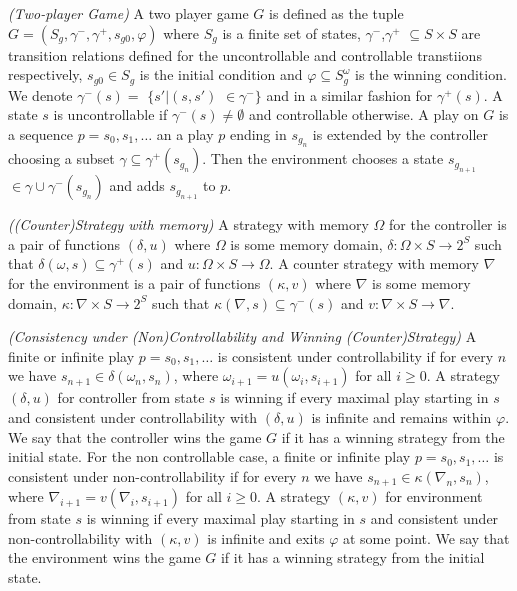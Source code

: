 \begin{definition}\label{def:twoplayer-game}\emph{(Two-player Game)}
A two player game $G$ is defined as the tuple $G=(S_g,\gamma^{-},\gamma^{+},s_{g0}, \varphi)$ where $S_{g}$ is a finite set of states, $\gamma^{-}$,$\gamma^{+}$ $\subseteq S\times S$ are transition relations defined for the uncontrollable and controllable transtiions respectively, $s_{g0}\in S_{g}$ is the initial condition and $\varphi \subseteq S_{g}^{\omega}$ is the winning condition.  We denote $\gamma^{-}(s) =$ $\{s'|(s,s')$ $\in \gamma^{-}\}$ and in a similar fashion for $\gamma^{+}(s)$. A state $s$ is uncontrollable if $\gamma^{-}(s)\neq \emptyset$ and controllable otherwise.  A play on $G$ is a sequence $p=s_0,s_1,\ldots$ an a play $p$ ending in $s_{g_{n}}$ is extended by the controller choosing a subset $\gamma \subseteq \gamma^{+}(s_{g_{n}})$.  Then the environment chooses a state $s_{g_{n+1}}$ $\in \gamma \cup \gamma^{-}(s_{g_{n}})$ and adds $s_{g_{n+1}}$ to $p$.
\end{definition}

\begin{definition}\label{def:strategy}\emph{((Counter)Strategy with memory)}
A strategy with memory $\Omega$ for the controller is a pair of functions $(\delta, u)$ where $\Omega$ is some memory domain, $\delta:\Omega\times S \rightarrow 2^{S}$ such that $\delta(\omega, s) \subseteq \gamma^{+}(s)$ and $u:\Omega \times S \rightarrow \Omega$.
A counter strategy with memory $\nabla$ for the environment is a pair of functions $(\kappa, v)$ where $\nabla$ is some memory domain, $\kappa:\nabla\times S \rightarrow 2^{S}$ such that $\kappa(\nabla, s) \subseteq \gamma^{-}(s)$ and $v:\nabla \times S \rightarrow \nabla$.
\end{definition}


\begin{definition}\label{def:consistency}\emph{(Consistency under (Non)Controllability and Winning (Counter)Strategy)}
A finite or infinite play $p= s_0,s_1,\ldots$ is consistent under controllability if for every $n$ we have $s_{n+1} \in \delta(\omega_n,s_n)$, where $\omega_{i+1}=u(\omega_i,s_{i+1})$ for all
$i \geq 0$. A strategy $(\delta, u)$ for controller from state $s$ is 
winning if every maximal play starting in $s$ and consistent under controllability with $(\delta, u)$ is infinite and remains within $\varphi$.  We say that the controller wins the game $G$ if it has a winning strategy from the initial state. For the non controllable case,
a finite or infinite play $p= s_0,s_1,\ldots$ is consistent under non-controllability if for every $n$ we have $s_{n+1} \in \kappa(\nabla_n,s_n)$, where $\nabla_{i+1}=v(\nabla_i,s_{i+1})$ for all
$i \geq 0$. A strategy $(\kappa, v)$ for environment from state $s$ is 
winning if every maximal play starting in $s$ and consistent under non-controllability with $(\kappa, v)$ is infinite and exits $\varphi$ at some point.  We say that the environment wins the game $G$ if it has a winning strategy from the initial state.
\end{definition}

